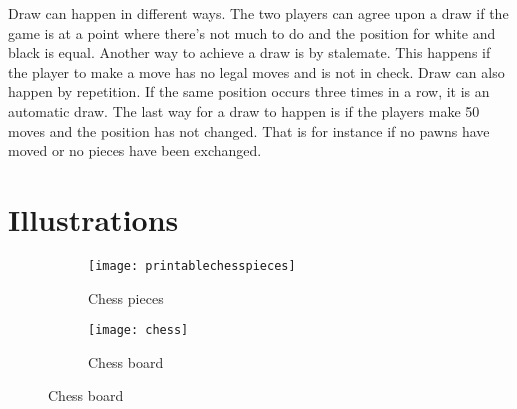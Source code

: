 \documentclass{article}
\begin{document}
\begin{description}[align=right]
\item [Draw:] \hspace{6mm} Draw can happen in different ways. The two players can agree upon a draw if the game is at a point where there's not much to do and the position for white and black is equal. Another way to achieve a draw is by stalemate. This happens if the player to make a move has no legal moves and is not in check. Draw can also happen by repetition. If the same position occurs three times in a row, it is an automatic draw. The last way for a draw to happen is if the players make 50 moves and the position has not changed. That is for instance if no pawns have moved or no pieces have been exchanged.
\end{description}

\section{Illustrations}
\begin{figure} [h!]
	\begin{subfigure}[b]{0.5\textwidth}
		\texttt{[image: printablechesspieces]}
        \caption{Chess pieces}
        \label{fig:printablechesspieces}
	\end{subfigure}
    \begin{subfigure}[b]{0.5\textwidth}
		\texttt{[image: chess]}
        \caption{Chess board}
        \label{fig:chess}
	\end{subfigure}

\end{figure}
\end{document}
